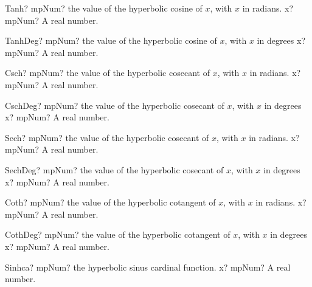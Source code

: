 \documentclass[12pt,a4paper,openany]{book}
\begin{document}
\begin{mpFunctionsExtract}
\mpFunctionOne
{Tanh? mpNum? the value of the hyperbolic cosine of $x$, with $x$ in radians.}
{x? mpNum? A real number.}
\end{mpFunctionsExtract}

\begin{mpFunctionsExtract}
\mpFunctionOne
{TanhDeg? mpNum? the value of the hyperbolic cosine of $x$, with $x$ in degrees}
{x? mpNum? A real number.}
\end{mpFunctionsExtract}

\begin{mpFunctionsExtract}
\mpFunctionOne
{Csch? mpNum? the value of the hyperbolic cosecant of $x$, with $x$ in radians.}
{x? mpNum? A real number.}
\end{mpFunctionsExtract}

\begin{mpFunctionsExtract}
\mpFunctionOne
{CschDeg? mpNum? the value of the hyperbolic cosecant of $x$, with $x$ in degrees}
{x? mpNum? A real number.}
\end{mpFunctionsExtract}

\begin{mpFunctionsExtract}
\mpFunctionOne
{Sech? mpNum? the value of the hyperbolic cosecant of $x$, with $x$ in radians.}
{x? mpNum? A real number.}
\end{mpFunctionsExtract}

\begin{mpFunctionsExtract}
\mpFunctionOne
{SechDeg? mpNum? the value of the hyperbolic cosecant of $x$, with $x$ in degrees}
{x? mpNum? A real number.}
\end{mpFunctionsExtract}

\begin{mpFunctionsExtract}
\mpFunctionOne
{Coth? mpNum? the value of the hyperbolic cotangent of $x$, with $x$ in radians.}
{x? mpNum? A real number.}
\end{mpFunctionsExtract}

\begin{mpFunctionsExtract}
\mpFunctionOne
{CothDeg? mpNum? the value of the hyperbolic cotangent of $x$, with $x$ in degrees}
{x? mpNum? A real number.}
\end{mpFunctionsExtract}

\begin{mpFunctionsExtract}
\mpFunctionOne
{Sinhca? mpNum? the hyperbolic sinus cardinal function.}
{x? mpNum? A real number.}
\end{mpFunctionsExtract}
\end{document}
